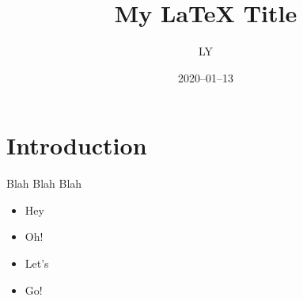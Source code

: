 \documentclass[12pt]{article}
\title{My LaTeX Title}
\author{LY}
\date{2020–01–13}
\begin{document}
\maketitle

\section{Introduction}

Blah Blah Blah

\begin{itemize}

\item Hey

\item Oh!

\item Let’s

\item Go!

\end{itemize}
\end{document}
